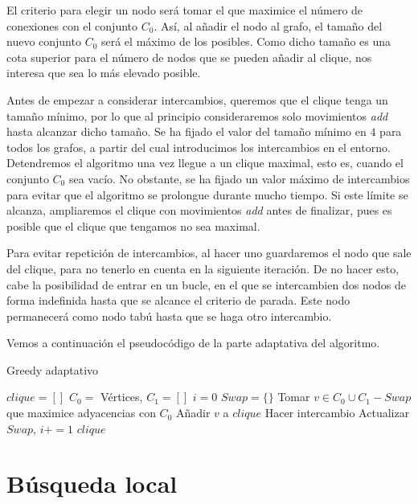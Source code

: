 El criterio para elegir un nodo será tomar el que maximice el número de conexiones
con el conjunto $C_0$. Así, al añadir el nodo al grafo, el tamaño del nuevo conjunto
$C_0$ será el máximo de los posibles. Como dicho tamaño es una cota superior para
el número de nodos que se pueden añadir al clique, nos interesa que sea lo más
elevado posible.

Antes de empezar a considerar intercambios, queremos que el clique tenga un tamaño
mínimo, por lo que al principio consideraremos solo movimientos \textit{add} hasta
alcanzar dicho tamaño. Se ha fijado el valor del tamaño mínimo en $4$ para todos
los grafos, a partir del cual introducimos los intercambios en el entorno.
Detendremos el algoritmo una vez llegue a un clique maximal, esto es, cuando el
conjunto $C_0$ sea vacío. No obstante, se ha fijado un valor máximo de intercambios
para evitar que el algoritmo se prolongue durante mucho tiempo. Si este límite se
alcanza, ampliaremos el clique con movimientos \textit{add} antes de finalizar, pues
es posible que el clique que tengamos no sea maximal.

Para evitar repetición de intercambios, al hacer uno guardaremos el nodo que sale
del clique, para no tenerlo en cuenta en la siguiente iteración. De no hacer esto,
cabe la posibilidad de entrar en un bucle, en el que se intercambien dos nodos
de forma indefinida hasta que se alcance el criterio de parada. Este nodo permanecerá
como nodo tabú hasta que se haga otro intercambio.

Vemos a continuación el pseudocódigo de la parte adaptativa del algoritmo.

\begin{algorithm}[H]
\caption{Greedy adaptativo}
  \begin{algorithmic}
  \State $clique = [ ]$
  \State $C_0 = $ Vértices, $C_1 = [ ]$
  \State $i = 0$
  \State $Swap = \{\}$
  \Repeat
    \State Tomar $v \in C_0 \cup C_1 - Swap$ que maximice adyacencias con $C_0$
      \State Añadir $v$ a $clique$
    \Else
      \State Hacer intercambio
      \State Actualizar $Swap$, $i += 1$
    \EndIf
  \Return $clique$
  \EndFunction
  \end{algorithmic}
\end{algorithm}


\section{Búsqueda local}\label{busquedalocal}

